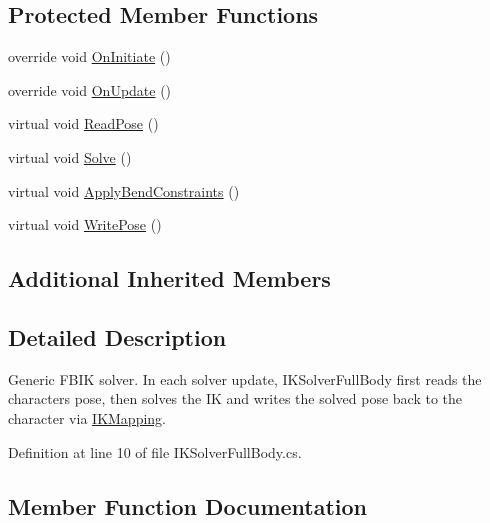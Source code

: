 \subsection*{Protected Member Functions}
\begin{DoxyCompactItemize}
\item 
override void \mbox{\hyperlink{class_root_motion_1_1_final_i_k_1_1_i_k_solver_full_body_a314815fbee3caadfd26d449764ee6e5c}{On\+Initiate}} ()
\item 
override void \mbox{\hyperlink{class_root_motion_1_1_final_i_k_1_1_i_k_solver_full_body_a465b375253ab446e5f3ae14614290174}{On\+Update}} ()
\item 
virtual void \mbox{\hyperlink{class_root_motion_1_1_final_i_k_1_1_i_k_solver_full_body_abee6485084ea3120e974145609fe7838}{Read\+Pose}} ()
\item 
virtual void \mbox{\hyperlink{class_root_motion_1_1_final_i_k_1_1_i_k_solver_full_body_aa425f453f41406b05061e3512d98ce96}{Solve}} ()
\item 
virtual void \mbox{\hyperlink{class_root_motion_1_1_final_i_k_1_1_i_k_solver_full_body_ad6b05a4f0312f9f6df7de38b1222a649}{Apply\+Bend\+Constraints}} ()
\item 
virtual void \mbox{\hyperlink{class_root_motion_1_1_final_i_k_1_1_i_k_solver_full_body_a08443a6f8b4f9dcfc4d0e5e8426ada7a}{Write\+Pose}} ()
\end{DoxyCompactItemize}
\subsection*{Additional Inherited Members}


\subsection{Detailed Description}
Generic F\+B\+IK solver. In each solver update, I\+K\+Solver\+Full\+Body first reads the character\textquotesingle{}s pose, then solves the IK and writes the solved pose back to the character via \mbox{\hyperlink{class_root_motion_1_1_final_i_k_1_1_i_k_mapping}{I\+K\+Mapping}}. 



Definition at line 10 of file I\+K\+Solver\+Full\+Body.\+cs.



\subsection{Member Function Documentation}
\mbox{\label{class_root_motion_1_1_final_i_k_1_1_i_k_solver_full_body_ad6b05a4f0312f9f6df7de38b1222a649}} 
